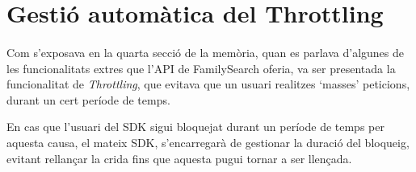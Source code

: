 \section{Gestió automàtica del Throttling}

    \paragraph{}
    Com s'exposava en la quarta secció de la memòria, quan es parlava d'algunes de les funcionalitats extres que l’API de FamilySearch oferia, va ser presentada la funcionalitat de \emph{Throttling}, que evitava que un usuari realitzes `masses' peticions, durant un cert període de temps.

    En cas que l'usuari del SDK sigui bloquejat durant un període de temps per aquesta causa, el mateix SDK, s'encarregarà de gestionar la duració del bloqueig, evitant rellançar la crida fins que aquesta pugui tornar a ser llençada.
